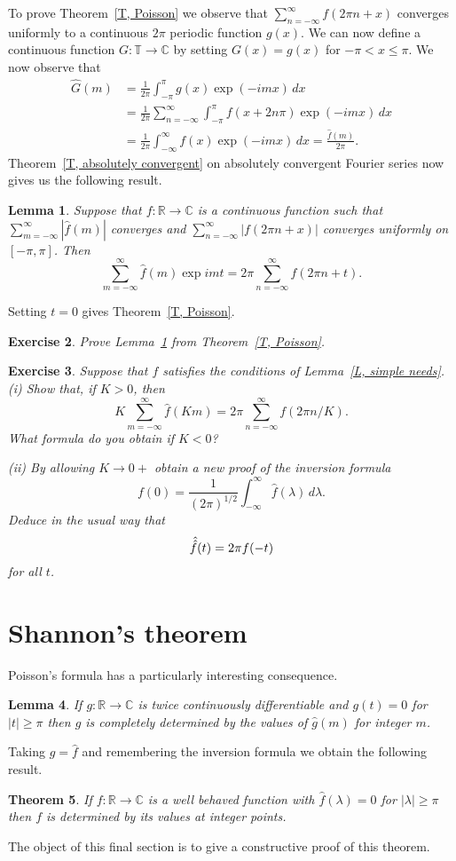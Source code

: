 \documentclass[12pt]{article}
\newtheorem{theorem}{Theorem}[section]
\newtheorem{lemma}[theorem]{Lemma}
\newtheorem{exercise}[theorem]{Exercise}
\theoremstyle{definition}
\begin{document}
To prove Theorem~\ref{T, Poisson} we observe that
$\sum_{n=-\infty}^{\infty}f(2\pi n+x)$ converges uniformly
to a continuous $2\pi$ periodic function $g(x)$.
We can now define a continuous function $G:{\mathbb T}\rightarrow{\mathbb C}$
by setting $G(x)=g(x)$ for $-\pi<x\leq \pi$. We now observe that
\begin{align*}
\hat{G}(m)&=\frac{1}{2\pi}\int_{-\pi}^{\pi}g(x)\exp(-imx)\,dx\\
&=\frac{1}{2\pi}\sum_{n=-\infty}^{\infty}
\int_{-\pi}^{\pi}f(x+2n\pi)\exp(-imx)\,dx\\
&=\frac{1}{2\pi}\int_{-\infty}^{\infty}f(x)\exp(-imx)\,dx
=\frac{\hat{f}(m)}{2\pi}.
\end{align*}
Theorem~\ref{T, absolutely convergent} on absolutely convergent
Fourier series now gives us the following result.
\begin{lemma}\label{L, Poisson two}
Suppose that
$f:{\mathbb R}\rightarrow{\mathbb C}$ is a continuous
function such that $\sum_{m=-\infty}^{\infty}|\hat{f}(m)|$
converges and $\sum_{n=-\infty}^{\infty}|f(2\pi n+x)|$
converges uniformly on $[-\pi,\pi]$. Then
\[\sum_{m=-\infty}^{\infty}\hat{f}(m)\exp imt=
2\pi\sum_{n=-\infty}^{\infty}f(2\pi n+t).\]
\end{lemma}
Setting $t=0$ gives Theorem~\ref{T, Poisson}.
\begin{exercise}\label{E, Poisson both ways}
Prove Lemma~\ref{L, Poisson two} from
Theorem~\ref{T, Poisson}.
\end{exercise} 
\begin{exercise}\label{E invers via Poisson} 
Suppose that $f$ satisfies the conditions
of Lemma~\ref{L, simple needs}. 
(i) Show that, if $K>0$, then
\[K\sum_{m=-\infty}^{\infty}\hat{f}(Km)=
2\pi\sum_{n=-\infty}^{\infty}f(2\pi n/K).\]
What formula do you obtain if $K<0$?

(ii) By allowing $K\rightarrow 0+$ obtain a new proof
of the inversion formula
\[f(0)=\frac{1}{(2\pi)^{1/2}}
\int_{-\infty}^{\infty}\hat{f}(\lambda)\,d\lambda.\]
Deduce in the usual way that
\[\Hat{\Hat{f}}(t)=2\pi f(-t)\]
for all $t$.
\end{exercise}
\section{Shannon's theorem}
Poisson's formula has a particularly interesting consequence.
\begin{lemma} If $g:{\mathbb R}\rightarrow{\mathbb C}$
is twice continuously differentiable and
$g(t)=0$ for $|t|\geq \pi$ then $g$ is completely
determined by the values of $\hat{g}(m)$ for
integer $m$.
\end{lemma}
Taking $g=\hat{f}$ and remembering the inversion formula
we obtain the following result.
\begin{theorem}\label{before Shannon}
If $f:{\mathbb R}\rightarrow{\mathbb C}$
is a well behaved function with $\hat{f}(\lambda)=0$
for $|\lambda|\geq\pi$
then $f$ is determined by its values at integer
points.
\end{theorem}
The object of this final section is to give a constructive
proof of this theorem.
\end{document}
